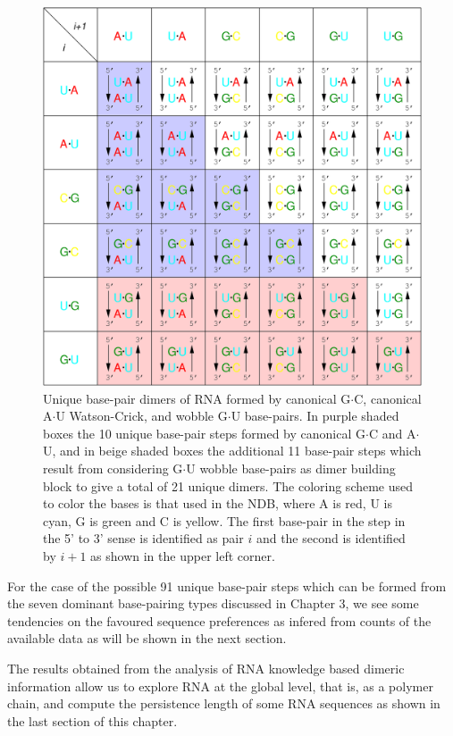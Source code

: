\begin{figure}
\centering
\includegraphics[angle=0, scale=0.4]{Chapter4/unique.png}
\caption{Unique base-pair dimers of RNA formed by canonical G$\cdot$C,
  canonical    A$\cdot$U    Watson-Crick,    and   wobble    G$\cdot$U
  base-pairs.  In purple shaded  boxes the  10 unique  base-pair steps
  formed  by canonical G$\cdot$C  and A$\cdot$U,  and in  beige shaded
  boxes  the   additional  11   base-pair  steps  which   result  from
  considering G$\cdot$U  wobble base-pairs as dimer  building block to
  give a total of 21 unique  dimers. The coloring scheme used to color
  the bases is that  used in the NDB, where A is red,  U is cyan, G is
  green and C is yellow. The first  base-pair in the step in the 5' to
  3' sense is  identified as pair $i$ and the  second is identified by
  $i+1$ as shown in the upper left corner.}
\label{fig:unique}
\end{figure}  

For the  case of the possible  91 unique base-pair steps  which can be
formed from the seven  dominant base-pairing types discussed in Chapter
3,  we see  some tendencies  on the  favoured sequence  preferences as
infered from counts of the available data as will be shown in the next
section. 

The   results  obtained   from  the  analysis   of  RNA knowledge
based dimeric information allow  us to  explore RNA  at  the global
level, that is, as a polymer chain, and compute the persistence length
of some RNA sequences as shown in the last section of this chapter.


